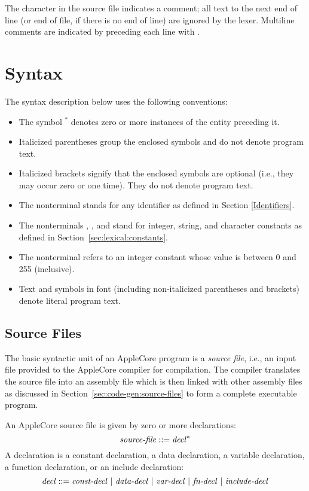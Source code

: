 \documentclass[10pt]{article}
\begin{document}
The character \kwd{\#} in the source file indicates a comment; all
text to the next end of line (or end of file, if there is no end of
line) are ignored by the lexer.  Multiline comments are indicated by
preceding each line with \kwd{\#}.

\section{Syntax}
\label{sec:syntax}

The syntax description below uses the following conventions:
%
\begin{itemize}
%
\item The symbol $^*$ denotes zero or more instances of the entity
  preceding it.
%
\item Italicized parentheses \group{} group the enclosed symbols and
  do not denote program text.
%
\item Italicized brackets \opt{} signify that the enclosed symbols are
  optional (i.e., they may occur zero or one time).  They do not
  denote program text.
%
\item The nonterminal  stands for any identifier
  as defined in Section \ref{Identifiers}.
%
\item The nonterminals ,
  , and  stand for integer,
  string, and character constants as defined in
  Section~\ref{sec:lexical:constants}.
%
\item The nonterminal  refers to an integer constant
  whose value is between 0 and 255 (inclusive).
%
\item Text and symbols in  font (including
  non-italicized parentheses and brackets) denote literal program
  text.
%
\end{itemize}

\subsection{Source Files}
\label{sec:syntax:source-files}

The basic syntactic unit of an AppleCore program is a \emph{source
  file}, i.e., an input file provided to the AppleCore compiler for
compilation.  The compiler translates the source file into an assembly
file which is then linked with other assembly files as discussed in
Section~\ref{sec:code-gen:source-files} to form a complete executable
program.

An AppleCore source file is given by zero or more
declarations:
%
$$\mbox{\textit{source-file}} ::= \mbox{\textit{decl}}^*$$
%
A declaration is a constant declaration, a data declaration, a
variable declaration, a function declaration, or an include
declaration:
%
$$\mbox{\textit{decl}} ::= \mbox{\ensuremath{\mbox{\textit{const-decl}}} $|$
  \ensuremath{\mbox{\textit{data-decl}}} $|$ \ensuremath{\mbox{\textit{var-decl}}} $|$ \ensuremath{\mbox{\textit{fn-decl}}}
    $|$ \ensuremath{\mbox{\textit{include-decl}}}}$$
\end{document}
